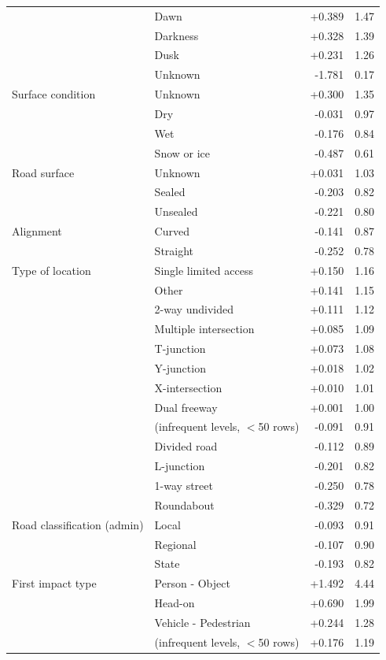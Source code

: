 \documentclass[11pt,a4paper]{article}
\begin{document}
{\begin{longtable}{@{}p{3.6cm}p{6.6cm}rr@{}}
 & Dawn & +0.389 & 1.47 \\
 & Darkness & +0.328 & 1.39 \\
 & Dusk & +0.231 & 1.26 \\
 & Unknown & -1.781 & 0.17 \\
\addlinespace[2pt]
Surface condition & Unknown & +0.300 & 1.35 \\
 & Dry & -0.031 & 0.97 \\
 & Wet & -0.176 & 0.84 \\
 & Snow or ice & -0.487 & 0.61 \\
\addlinespace[2pt]
Road surface & Unknown & +0.031 & 1.03 \\
 & Sealed & -0.203 & 0.82 \\
 & Unsealed & -0.221 & 0.80 \\
\addlinespace[2pt]
Alignment & Curved & -0.141 & 0.87 \\
 & Straight & -0.252 & 0.78 \\
\addlinespace[2pt]
Type of location & Single limited access & +0.150 & 1.16 \\
 & Other & +0.141 & 1.15 \\
 & 2-way undivided & +0.111 & 1.12 \\
 & Multiple intersection & +0.085 & 1.09 \\
 & T-junction & +0.073 & 1.08 \\
 & Y-junction & +0.018 & 1.02 \\
 & X-intersection & +0.010 & 1.01 \\
 & Dual freeway & +0.001 & 1.00 \\
 & (infrequent levels, $<$50 rows) & -0.091 & 0.91 \\
 & Divided road & -0.112 & 0.89 \\
 & L-junction & -0.201 & 0.82 \\
 & 1-way street & -0.250 & 0.78 \\
 & Roundabout & -0.329 & 0.72 \\
\addlinespace[2pt]
Road classification (admin) & Local & -0.093 & 0.91 \\
 & Regional & -0.107 & 0.90 \\
 & State & -0.193 & 0.82 \\
\addlinespace[2pt]
First impact type & Person - Object & +1.492 & 4.44 \\
 & Head-on & +0.690 & 1.99 \\
 & Vehicle - Pedestrian & +0.244 & 1.28 \\
 & (infrequent levels, $<$50 rows) & +0.176 & 1.19 \\

\end{longtable}}
\end{document}
